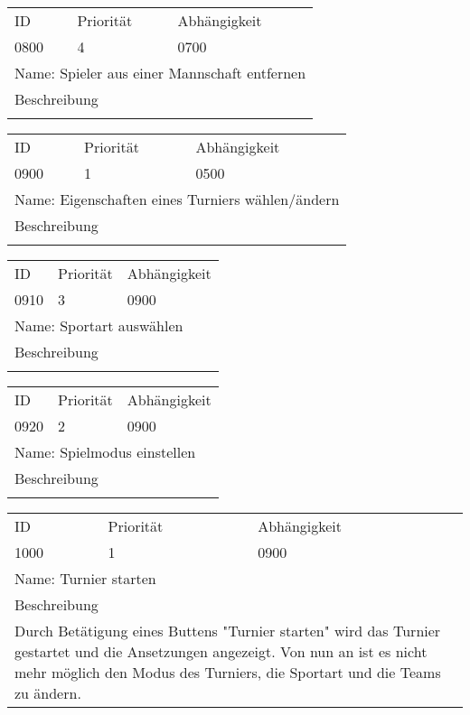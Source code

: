 	\begin{tabularx}{\textwidth}{|X|X|X|}
		\hline
		ID & Priorität & Abhängigkeit \\
		0800 & 4 & 0700\\
		\hline
		\multicolumn{3}{|l|}{Name: Spieler aus einer Mannschaft entfernen} \\
		\hline
		\multicolumn{3}{|l|}{Beschreibung}\\
		\multicolumn{3}{|l|}{}\\
		\hline		 
	\end{tabularx}
	
	\begin{tabularx}{\textwidth}{|X|X|X|}
		\hline
		ID & Priorität & Abhängigkeit \\
		0900 & 1 & 0500\\
		\hline
		\multicolumn{3}{|l|}{Name: Eigenschaften eines Turniers wählen/ändern} \\
		\hline
		\multicolumn{3}{|l|}{Beschreibung}\\
		\multicolumn{3}{|l|}{}\\
		\hline		 
	\end{tabularx}
	
	\begin{tabularx}{\textwidth}{|X|X|X|}
		\hline
		ID & Priorität & Abhängigkeit \\
		0910 & 3 & 0900\\
		\hline
		\multicolumn{3}{|l|}{Name: Sportart auswählen} \\
		\hline
		\multicolumn{3}{|l|}{Beschreibung}\\
		\multicolumn{3}{|l|}{}\\
		\hline		 
	\end{tabularx}
	
	\begin{tabularx}{\textwidth}{|X|X|X|}
		\hline
		ID & Priorität & Abhängigkeit \\
		0920 & 2 & 0900\\
		\hline
		\multicolumn{3}{|l|}{Name: Spielmodus einstellen} \\
		\hline
		\multicolumn{3}{|l|}{Beschreibung}\\
		\multicolumn{3}{|l|}{}\\
		\hline		 
	\end{tabularx}
	
	\begin{tabularx}{\textwidth}{|X|X|X|}
		\hline
		ID & Priorität & Abhängigkeit \\
		1000 & 1 & 0900\\
		\hline
		\multicolumn{3}{|l|}{Name: Turnier starten} \\
		\hline
		\multicolumn{3}{|l|}{Beschreibung}\\
		\multicolumn{3}{|l|}{Durch Betätigung eines Buttens "Turnier starten" wird das Turnier gestartet und die Ansetzungen angezeigt. Von nun an ist es nicht mehr möglich den Modus des Turniers, die Sportart und die Teams zu ändern. }\\
		\hline		 
	\end{tabularx}
	
